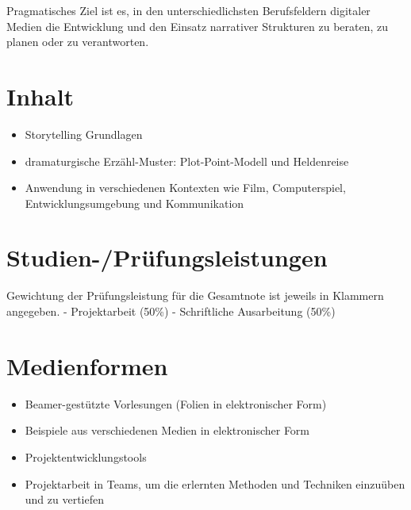 Pragmatisches Ziel ist es, in den unterschiedlichsten Berufsfeldern
digitaler Medien die Entwicklung und den Einsatz narrativer Strukturen
zu beraten, zu planen oder zu verantworten.

\section*{Inhalt\label{/mi-2017/modulbeschreibungen-master/MA_VC_Modul_Storytelling}}\label{inhaltpathlabelmi-2017modulbeschreibungen-mastermaux5fvcux5fmodulux5fstorytelling}

\begin{itemize}
\tightlist
\item
  Storytelling Grundlagen
\item
  dramaturgische Erzähl-Muster: Plot-Point-Modell und Heldenreise
\item
  Anwendung in verschiedenen Kontexten wie Film, Computerspiel,
  Entwicklungsumgebung und Kommunikation
\end{itemize}

\section*{Studien-/Prüfungsleistungen\label{/mi-2017/modulbeschreibungen-master/MA_VC_Modul_Storytelling}}\label{studien-pruxfcfungsleistungenpathlabelmi-2017modulbeschreibungen-mastermaux5fvcux5fmodulux5fstorytelling}

Gewichtung der Prüfungsleistung für die Gesamtnote ist jeweils in
Klammern angegeben. - Projektarbeit (50\%) - Schriftliche Ausarbeitung
(50\%)

\section*{Medienformen\label{/mi-2017/modulbeschreibungen-master/MA_VC_Modul_Storytelling}}\label{medienformenpathlabelmi-2017modulbeschreibungen-mastermaux5fvcux5fmodulux5fstorytelling}

\begin{itemize}
\tightlist
\item
  Beamer-gestützte Vorlesungen (Folien in elektronischer Form)
\item
  Beispiele aus verschiedenen Medien in elektronischer Form
\item
  Projektentwicklungstools
\item
  Projektarbeit in Teams, um die erlernten Methoden und Techniken
  einzuüben und zu vertiefen
\end{itemize}

